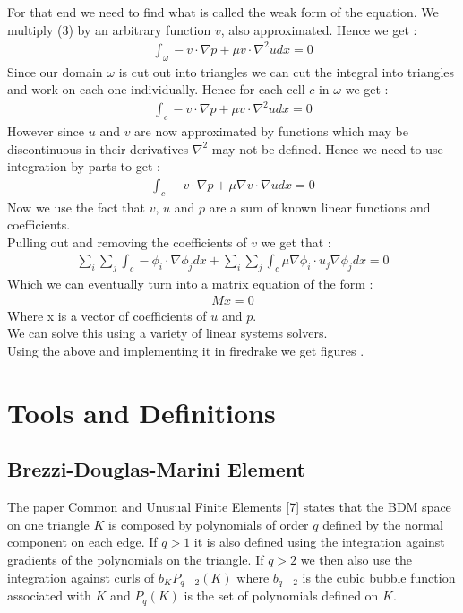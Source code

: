 \documentclass[11pt,twoside,a4paper]{article}
\begin{document}
For that end we need to find what is called the weak form of the equation. We multiply (3) by an arbitrary function $v$, also approximated. Hence we get :
\begin{align*}
\int_{\omega} -v \cdot \nabla p + \mu v \cdot \nabla^2 u dx = 0
\end{align*}
Since our domain $\omega$ is cut out into triangles we can cut the integral into triangles and work on each one individually. Hence for each cell $c$ in $\omega$ we get : 
\begin{align*}
\int_{c} -v \cdot \nabla p + \mu v \cdot \nabla^2 u dx = 0
\end{align*}
However since $u$ and $v$ are now approximated by functions which may be discontinuous in their derivatives $\nabla^2$ may not be defined. Hence we need to use integration by parts to get :  
\begin{align*}
\int_{c} -v \cdot \nabla p + \mu \nabla v \cdot \nabla u dx = 0
\end{align*}
Now we use the fact that $v$, $u$ and $p$ are a sum of known linear functions and coefficients.\\
Pulling out and removing the coefficients of $v$ we get that :
\begin{align*}
\sum_i \sum_j \int_{c} -\phi_i \cdot \nabla \phi_j dx+ \sum_i \sum_j  \int_{c} \mu \nabla \phi_i \cdot u_j \nabla \phi_j dx = 0
\end{align*}
Which we can eventually turn into a matrix equation of the form :
\begin{align}
M x = 0
\end{align}
Where x is a vector of coefficients of $u$ and $p$.\\
We can solve this using a variety of linear systems solvers.\\
Using the above and implementing it in firedrake we get figures .
\section{Tools and Definitions}
\subsection{Brezzi-Douglas-Marini Element}
The paper Common and Unusual Finite Elements [7] states that the BDM space on one triangle $K$ is composed by polynomials of order $q$ defined by the normal component on each edge. If $q > 1$ it is also defined using the integration against gradients of the polynomials on the triangle. If $q > 2$ we then also use the integration  against curls of $b_K P_{q-2}(K)$ where $b_{q-2}$ is the  cubic bubble function associated with $K$ and $P_{q}(K)$ is the set of polynomials defined on $K$.
\end{document}
